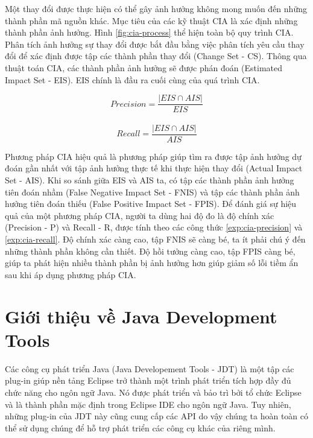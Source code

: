 \documentclass[12pt]{report}
\begin{document}
Một thay đổi được thực hiện có thể gây ảnh hưởng không mong muốn đến những thành phần mã nguồn khác. Mục tiêu của các kỹ thuật CIA là xác định những thành phần ảnh hưởng. Hình \ref{fig:cia-process} thể hiện toàn bộ quy trình CIA. Phân tích ảnh hưởng sự thay đổi được bắt đầu bằng việc phân tích yêu cầu thay đổi để xác định được tập các thành phần thay đổi (Change Set - CS). Thông qua thuật toán CIA, các thành phần ảnh hưởng sẽ được phán đoán (Estimated Impact Set - EIS). EIS chính là đầu ra cuối cùng của quá trình CIA.

\begin{equation}
Precision = \frac{|EIS \cap AIS|}{EIS}
\label{exp:cia-precision}
\end{equation}
\\
\begin{equation}
Recall = \frac{|EIS \cap AIS|}{AIS}
\label{exp:cia-recall}
\end{equation}

Phương pháp CIA hiệu quả là phương pháp giúp tìm ra được tập ảnh hưởng dự đoán gần nhất với tập ảnh hưởng thực tế khi thực hiện thay đổi (Actual Impact Set - AIS). Khi so sánh giữa EIS và AIS ta, có tập các thành phần ảnh hưởng tiên đoán nhầm (False Negative Impact Set - FNIS) và tập các thành phần ảnh hưởng tiên đoán thiếu (False Positive Impact Set - FPIS). Để đánh giá sự hiệu quả của một phương pháp CIA, người ta dùng hai độ đo là độ chính xác (Precision - P) và Recall - R, được tính theo các công thức \ref{exp:cia-precision} và \ref{exp:cia-recall}. Độ chính xác càng cao, tập FNIS sẽ càng bé, ta ít phải chú ý đến những thành phần không cần thiết. Độ hồi tưởng càng cao, tập FPIS càng bé, giúp ta phát hiện nhiều thành phần bị ảnh hưởng hơn giúp giảm số lỗi tiềm ẩn sau khi áp dụng phương pháp CIA.

\section{Giới thiệu về Java Development Tools}
Các công cụ phát triển Java (Java Developement Tools - JDT) là một tập các plug-in giúp nền tảng Eclipse trở thành một trình phát triển tích hợp đầy đủ chức năng cho ngôn ngữ Java. Nó được phát triển và bảo trì bởi tổ chức Eclipse và là thành phần mặc định trong Eclipse IDE cho ngôn ngữ Java. Tuy nhiên, những plug-in của JDT này cũng cung cấp các API do vậy chúng ta hoàn toàn có thể sử dụng chúng để hỗ trợ phát triển các công cụ khác của riêng mình.
\end{document}
